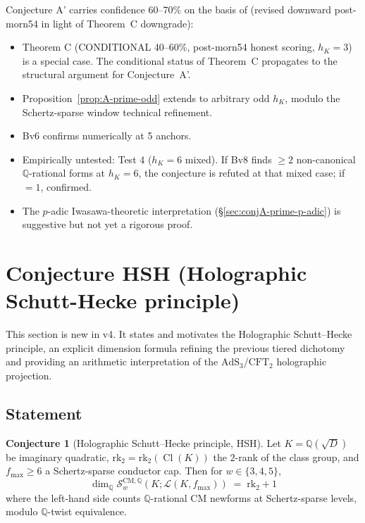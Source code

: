 \documentclass[11pt,a4paper]{amsart}
\theoremstyle{definition}
\newtheorem{conjecture}[theorem]{Conjecture}
\DeclareMathOperator{\Cl}{Cl}
\newcommand{\Q}{\mathbb{Q}}
\newcommand{\Lcal}{\mathcal{L}}
\newcommand{\Scal}{\mathcal{S}}
\newcommand{\hK}{h_{K}}
\newcommand{\rktwo}{\mathrm{rk}_2}
\begin{document}
Conjecture A' carries confidence 60--70\% on the basis of (revised downward post-morn54 in light of Theorem~C downgrade):
\begin{itemize}[leftmargin=2em]
  \item Theorem C (CONDITIONAL 40--60\%, post-morn54 honest scoring, $\hK = 3$) is a special case. The conditional status of Theorem~C propagates to the structural argument for Conjecture~A'.
  \item Proposition~\ref{prop:A-prime-odd} extends to arbitrary odd $\hK$, modulo the Schertz-sparse window technical refinement.
  \item Bv6 confirms numerically at 5 anchors.
  \item Empirically untested: Test 4 ($\hK = 6$ mixed). If Bv8 finds $\ge 2$ non-canonical $\Q$-rational forms at $\hK = 6$, the conjecture is refuted at that mixed case; if $= 1$, confirmed.
  \item The $p$-adic Iwasawa-theoretic interpretation (\S\ref{sec:conjA-prime-p-adic}) is suggestive but not yet a rigorous proof.
\end{itemize}


\section{Conjecture HSH (Holographic Schutt-Hecke principle)}\label{sec:HSH}

This section is new in v4. It states and motivates the Holographic Schutt--Hecke principle, an explicit dimension formula refining the previous tiered dichotomy and providing an arithmetic interpretation of the $\mathrm{AdS}_3$/$\mathrm{CFT}_2$ holographic projection.

\subsection{Statement}\label{sec:HSH-statement}

\begin{conjecture}[Holographic Schutt--Hecke principle, HSH]\label{conj:HSH}
Let $K = \Q(\sqrt{D})$ be imaginary quadratic, $\rktwo = \rktwo(\Cl(K))$ the $2$-rank of the class group, and $f_{\max} \ge 6$ a Schertz-sparse conductor cap. Then for $w \in \{3, 4, 5\}$,
\[
\boxed{\;\dim_\Q \Scal_w^{\mathrm{CM}, \Q}(K; \Lcal(K, f_{\max})) \;=\; \rktwo + 1\;}
\]
where the left-hand side counts $\Q$-rational CM newforms at Schertz-sparse levels, modulo $\Q$-twist equivalence.
\end{conjecture}
\end{document}
